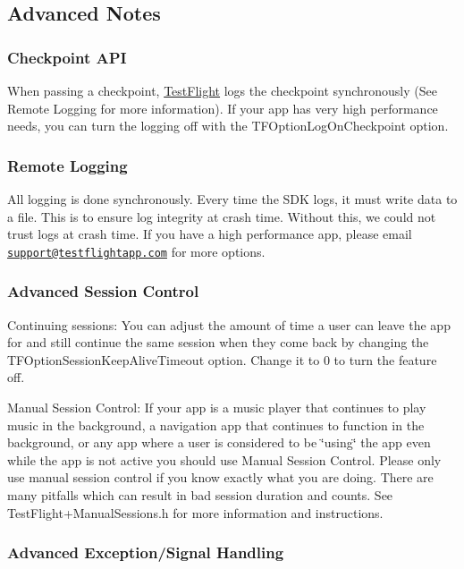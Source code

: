 \subsection*{Advanced Notes}

\subsubsection*{Checkpoint A\-P\-I}

When passing a checkpoint, \hyperlink{interface_test_flight}{Test\-Flight} logs the checkpoint synchronously (See Remote Logging for more information). If your app has very high performance needs, you can turn the logging off with the {\ttfamily T\-F\-Option\-Log\-On\-Checkpoint} option.

\subsubsection*{Remote Logging}

All logging is done synchronously. Every time the S\-D\-K logs, it must write data to a file. This is to ensure log integrity at crash time. Without this, we could not trust logs at crash time. If you have a high performance app, please email \href{mailto:support@testflightapp.com}{\tt support@testflightapp.\-com} for more options.

\subsubsection*{Advanced Session Control}

Continuing sessions\-: You can adjust the amount of time a user can leave the app for and still continue the same session when they come back by changing the {\ttfamily T\-F\-Option\-Session\-Keep\-Alive\-Timeout} option. Change it to 0 to turn the feature off.

Manual Session Control\-: If your app is a music player that continues to play music in the background, a navigation app that continues to function in the background, or any app where a user is considered to be \char`\"{}using\char`\"{} the app even while the app is not active you should use Manual Session Control. Please only use manual session control if you know exactly what you are doing. There are many pitfalls which can result in bad session duration and counts. See {\ttfamily Test\-Flight+\-Manual\-Sessions.h} for more information and instructions.

\subsubsection*{Advanced Exception/\-Signal Handling}

